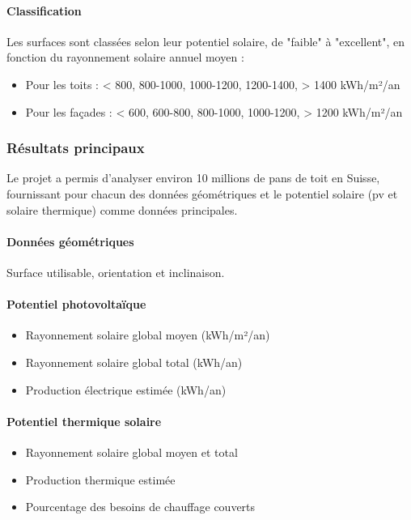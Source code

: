 {\paragraph{Classification}
\par{Les surfaces sont classées selon leur potentiel solaire, de "faible" à "excellent", en fonction du rayonnement solaire annuel moyen :}
\begin{itemize}
    \item Pour les toits : < 800, 800-1000, 1000-1200, 1200-1400, > 1400 kWh/m²/an
    \item Pour les façades : < 600, 600-800, 800-1000, 1000-1200, > 1200 kWh/m²/an
\end{itemize}

\subsubsection{Résultats principaux}
\par{Le projet a permis d'analyser environ 10 millions de pans de toit en Suisse, fournissant pour chacun des données géométriques et le potentiel solaire (\acrshort{pv} et solaire thermique) comme données principales.}
\paragraph{Données géométriques} Surface utilisable, orientation et inclinaison.
\paragraph{Potentiel photovoltaïque}
\begin{itemize}
    \item Rayonnement solaire global moyen (kWh/m²/an)
    \item Rayonnement solaire global total (kWh/an)
    \item Production électrique estimée (kWh/an)
\end{itemize}
\paragraph{Potentiel thermique solaire}
\begin{itemize}
    \item Rayonnement solaire global moyen et total
    \item Production thermique estimée
    \item Pourcentage des besoins de chauffage couverts
\end{itemize}
}
